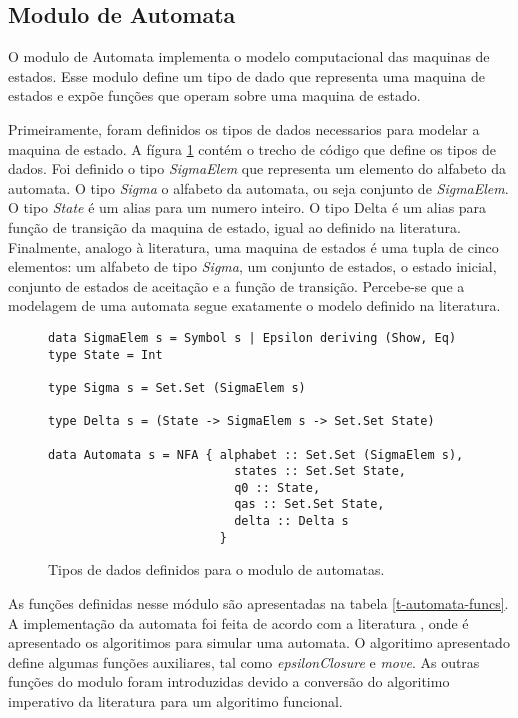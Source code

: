 \subsection{Modulo de Automata}

O modulo de Automata implementa o modelo computacional das maquinas de estados.
Esse modulo define um tipo de dado que representa uma maquina de estados e expõe funções que operam sobre uma maquina de estado.

Primeiramente, foram definidos os tipos de dados necessarios para modelar a maquina de estado.
A fígura \ref{f-data-automata} contém o trecho de código que define os tipos de dados.
Foi definido o tipo \emph{SigmaElem} que representa um elemento do alfabeto da automata.
O tipo \emph{Sigma} o alfabeto da automata, ou seja conjunto de \emph{SigmaElem}.
O tipo \emph{State} é um alias para um numero inteiro.
O tipo Delta é um alias para função de transição da maquina de estado, igual ao definido na literatura.
Finalmente, analogo à literatura, uma maquina de estados é uma tupla de cinco elementos: um alfabeto de tipo \emph{Sigma}, um conjunto de estados, o estado inicial, conjunto de estados de aceitação e a função de transição.
Percebe-se que a modelagem de uma automata segue exatamente o modelo definido na literatura.

\begin{figure}
\begin{lstlisting}
data SigmaElem s = Symbol s | Epsilon deriving (Show, Eq)
type State = Int

type Sigma s = Set.Set (SigmaElem s)

type Delta s = (State -> SigmaElem s -> Set.Set State)

data Automata s = NFA { alphabet :: Set.Set (SigmaElem s),
                          states :: Set.Set State,
                          q0 :: State,
                          qas :: Set.Set State,
                          delta :: Delta s
                        }
\end{lstlisting}
\caption{Tipos de dados definidos para o modulo de automatas.}
\label{f-data-automata}
\end{figure}



As funções definidas nesse módulo são apresentadas na tabela \ref{t-automata-funcs}.
A implementação da automata foi feita de acordo com a literatura \cite{dragon-book}, onde é apresentado os algoritimos para simular uma automata.
O algoritimo apresentado define algumas funções auxiliares, tal como \emph{epsilonClosure} e \emph{move}.
As outras funções do modulo foram introduzidas devido a conversão do algoritimo imperativo da literatura para um algoritimo funcional.

